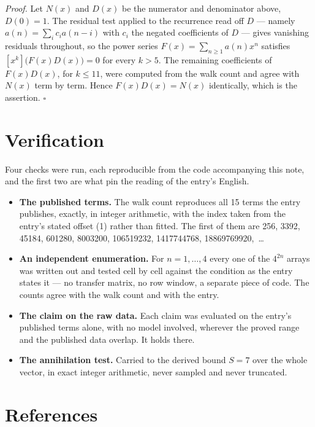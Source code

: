\documentclass[11pt]{article}
\theoremstyle{definition}
\begin{document}
{\itshape Proof.} Let $N(x)$ and $D(x)$ be the numerator and denominator above, $D(0)=1$. The residual test applied to the recurrence read off $D$ --- namely $a(n) = \sum_i c_i a(n-i)$ with $c_i$ the negated coefficients of $D$ --- gives vanishing residuals throughout, so the power series $F(x)=\sum_{n\ge 1}a(n)x^n$ satisfies $[x^k]\bigl(F(x)D(x)\bigr) = 0$ for every $k > 5$. The remaining coefficients of $F(x)D(x)$, for $k \le 11$, were computed from the walk count and agree with $N(x)$ term by term. Hence $F(x)D(x) = N(x)$ identically, which is the assertion. $\square$

\section{Verification}

Four checks were run, each reproducible from the code accompanying this note, and the first two are what pin the reading of the entry's English.

\begin{itemize}

\item {\bfseries The published terms.} The walk count reproduces all 15 terms the entry publishes, exactly, in integer arithmetic, with the index taken from the entry's stated offset (1) rather than fitted. The first of them are 256, 3392, 45184, 601280, 8003200, 106519232, 1417744768, 18869769920,~\dots

\item {\bfseries An independent enumeration.} For $n = 1,\dots,4$ every one of the $4^{2n}$ arrays was written out and tested cell by cell against the condition as the entry states it --- no transfer matrix, no row window, a separate piece of code. The counts agree with the walk count and with the entry.

\item {\bfseries The claim on the raw data.} Each claim was evaluated on the entry's published terms alone, with no model involved, wherever the proved range and the published data overlap. It holds there.

\item {\bfseries The annihilation test.} Carried to the derived bound $S = 7$ over the whole vector, in exact integer arithmetic, never sampled and never truncated.

\end{itemize}

\section{References}
\end{document}
